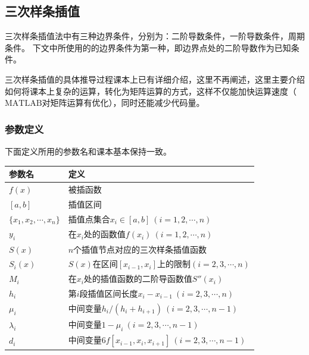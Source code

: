 \documentclass[12pt, a4paper, oneside]{ctexart}
\begin{document}
\subsection{三次样条插值}
三次样条插值法中有三种边界条件，分别为：二阶导数条件，一阶导数条件，周期条件。
下文中所使用的的边界条件为第一种，即边界点处的二阶导数作为已知条件。

三次样条插值的具体推导过程课本上已有详细介绍，这里不再阐述，这里主要介绍如何将课本上复杂的运算，转化为矩阵运算的方式，这样不仅能加快运算速度（$\text{MATLAB}$对矩阵运算有优化），同时还能减少代码量。
\subsubsection{参数定义}
下面定义所用的参数名和课本基本保持一致。
\renewcommand\arraystretch{0.8} %
\begin{table}[!htbp] %
    \centering %
    \begin{tabular}{p{3cm}<{\centering}p{10cm}<{\centering}} %
        \toprule
        参数名&定义\\
        \midrule
        $f(x)$ & 被插函数\\
        $[a,b]$ & 插值区间\\
        $\{x_1,x_2,\cdots, x_n\}$ & 插值点集合$x_i\in[a,b]\ (i=1,2,\cdots, n)$\\
        $y_i$ & 在$x_i$处的函数值$f(x_i)\ (i=1,2,\cdots, n)$\\
        $S(x)$ & $n$个插值节点对应的三次样条插值函数\\
        $S_i(x)$ & $S(x)$在区间$[x_{i-1},x_i]$上的限制$(i=2,3,\cdots,n)$\\
        $M_i$ & 在$x_i$处的插值函数的二阶导函数值$S''(x_i)$\\
        $h_i$ & 第$i$段插值区间长度$x_i-x_{i-1}\ (i=2,3,\cdots, n)$\\
        $\mu_i$ & 中间变量$h_i/(h_i+h_{i+1})\ (i=2,3,\cdots, n-1)$\\
        $\lambda_i$ & 中间变量$1-\mu_i\ (i=2,3,\cdots, n-1)$\\
        $d_i$ & 中间变量$6f[x_{i-1},x_i,x_{i+1}]\ (i=2,3,\cdots, n-1)$\\
        \bottomrule
    \end{tabular}
\end{table}
\end{document}
